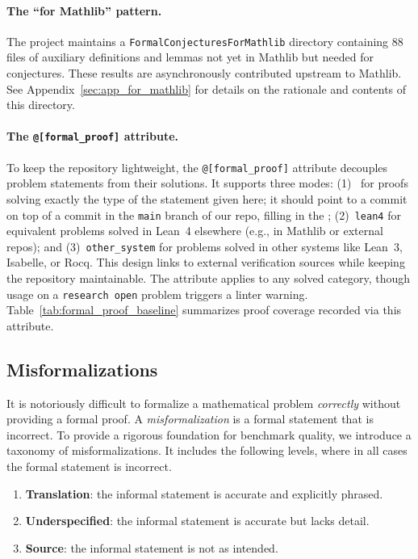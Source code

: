 \paragraph{The \enquote{for Mathlib} pattern.}
The project maintains a \texttt{FormalConjecturesForMathlib} directory containing 88 files of auxiliary definitions and lemmas not yet in Mathlib but needed for conjectures.
These results are asynchronously contributed upstream to Mathlib.
See Appendix~\ref{sec:app_for_mathlib} for details on the rationale and contents of this directory.


\paragraph{The \lstinline{@[formal_proof]} attribute.}
To keep the repository lightweight, the \lstinline{@[formal_proof]} attribute decouples problem statements from their solutions.
It supports three modes: (1)~ for proofs solving exactly the type of the statement given here; it should point to a commit on top of a commit in the \texttt{main} branch of our repo, filling in the ;
(2)~\lstinline{lean4} for equivalent problems solved in Lean~4 elsewhere (e.g., in Mathlib or external repos); and
(3)~\lstinline{other_system} for problems solved in other systems like Lean~3, Isabelle, or Rocq.
This design links to external verification sources while keeping the repository maintainable.
The attribute applies to any solved category, though usage on a \lstinline{research open} problem triggers a linter warning.
Table~\ref{tab:formal_proof_baseline} summarizes proof coverage recorded via this attribute.

\subsection{Misformalizations}
\label{sec:misform}

It is notoriously difficult to formalize a mathematical problem \emph{correctly} without providing a formal proof.
A \emph{misformalization} is a formal statement that is incorrect.
To provide a rigorous foundation for benchmark quality, we introduce a taxonomy of misformalizations.
It includes the following levels, where in all cases the formal statement is incorrect.
\begin{enumerate}
    \item \textbf{Translation}: the informal statement is accurate and explicitly phrased.
    \item \textbf{Underspecified}: the informal statement is accurate but lacks detail.
    \item \textbf{Source}: the informal statement is not as intended.
\end{enumerate}


